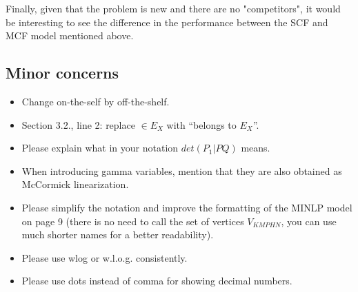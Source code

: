 \documentclass{article}
\newenvironment{reviewer}{\setcounter{pointcounter}{1}}{}
\newcommand{\point}{\text{{\selectfont \thepointcounter} \stepcounter{pointcounter}}}
\begin{document}
\begin{reviewer}
		\begin{itshape}
			Finally, given that the problem is new and there are no "competitors", it would be interesting to see the difference in the performance between the SCF and MCF model mentioned above.
		\end{itshape}
	
		\begin{tcolorbox}[breakable,enhanced,coltitle=black,colback=green!5!white,colframe=green!75!black,title=\textbf{Answer R2.\point},borderline={1pt}{0pt}{black},boxrule=0pt]
		
		\end{tcolorbox}
	
		\subsection*{Minor concerns}
		
		\begin{itshape}
			\begin{itemize}
				\item Change on-the-self by off-the-shelf.
				\item Section 3.2., line 2: replace $\in E_X$ with ``belongs to $E_X$''.
				\item Please explain what in your notation $det(P_1|PQ)$ means.
				\item When introducing gamma variables, mention that they are also obtained as McCormick linearization.
				\item Please simplify the notation and improve the formatting of the MINLP model on page 9 (there is no need to call the set of vertices $V_{KMPHN}$, you can use much shorter names for a better readability).
				\item Please use wlog or w.l.o.g. consistently.
				\item Please use dots instead of comma for showing decimal numbers.
			\end{itemize}
		\end{itshape}
	

\end{reviewer}
\end{document}
